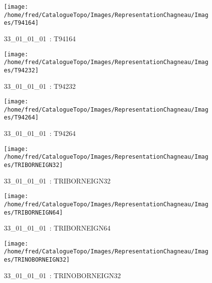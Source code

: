 \documentclass[12pt,titlepage,oneside]{book}
\begin{document}
\begin{figure}[h!]
\begin{minipage}[t]{3cm}
\begin{center}
      \texttt{[image: /home/fred/CatalogueTopo/Images/RepresentationChagneau/Images/T94164]}
      \caption[~33\_01\_01\_01]{\small{33\_01\_01\_01~:} \tiny{T94164}}\label{T94164}
    \end{center}
  \end{minipage}
  \begin{minipage}[t]{3cm}
    \begin{center}
      \texttt{[image: /home/fred/CatalogueTopo/Images/RepresentationChagneau/Images/T94232]}
      \caption[~33\_01\_01\_01]{\small{33\_01\_01\_01~:} \tiny{T94232}}\label{T94232}
    \end{center}
  \end{minipage}
  \begin{minipage}[t]{3cm}
    \begin{center}
      \texttt{[image: /home/fred/CatalogueTopo/Images/RepresentationChagneau/Images/T94264]}
      \caption[~33\_01\_01\_01]{\small{33\_01\_01\_01~:} \tiny{T94264}}\label{T94264}
    \end{center}
  \end{minipage}
  \begin{minipage}[t]{3cm}
    \begin{center}
      \texttt{[image: /home/fred/CatalogueTopo/Images/RepresentationChagneau/Images/TRIBORNEIGN32]}
      \caption[~33\_01\_01\_01]{\small{33\_01\_01\_01~:} \tiny{TRIBORNEIGN32}}\label{TRIBORNEIGN32}
    \end{center}
  \end{minipage}
  \begin{minipage}[t]{3cm}
    \begin{center}
      \texttt{[image: /home/fred/CatalogueTopo/Images/RepresentationChagneau/Images/TRIBORNEIGN64]}
      \caption[~33\_01\_01\_01]{\small{33\_01\_01\_01~:} \tiny{TRIBORNEIGN64}}\label{TRIBORNEIGN64}
    \end{center}
  \end{minipage}
  \begin{minipage}[t]{3cm}
    \begin{center}
      \texttt{[image: /home/fred/CatalogueTopo/Images/RepresentationChagneau/Images/TRINOBORNEIGN32]}
      \caption[~33\_01\_01\_01]{\small{33\_01\_01\_01~:} \tiny{TRINOBORNEIGN32}}\label{TRINOBORNEIGN32}

\end{center}
\end{minipage}
\end{figure}
\end{document}
